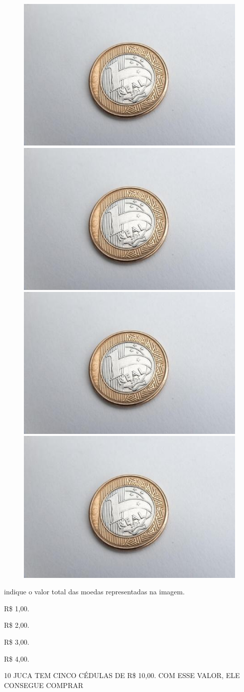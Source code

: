 
\begin{figure}[htpb!]
\centering
\includegraphics[width=.2\textwidth]{media/image60.jpg}
\includegraphics[width=.2\textwidth]{media/image60.jpg}
\includegraphics[width=.2\textwidth]{media/image60.jpg}
\includegraphics[width=.2\textwidth]{media/image60.jpg}
\end{figure}

indique o valor total das moedas representadas na imagem.

\begin{escolha}
\item R\$ 1,00.

\item R\$ 2,00.

\item R\$ 3,00.

\item R\$ 4,00.
\end{escolha}




\num{10} JUCA TEM CINCO CÉDULAS DE R\$ 10,00. COM ESSE VALOR, ELE CONSEGUE COMPRAR

